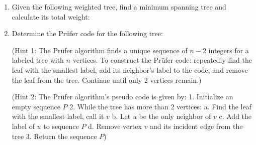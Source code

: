 \documentclass{article}
\theoremstyle{definition}
\begin{document}
\begin{enumerate}
\item Given the following weighted tree, find a minimum spanning tree and calculate its total weight:
\begin{center}
\end{center}

\item Determine the Prüfer code for the following tree:

(Hint 1: The Prüfer algorithm finds a unique sequence of $n-2$ integers for a labeled tree with $n$ vertices. To construct the Prüfer code: repeatedly find the leaf with the smallest label, add its neighbor's label to the code, and remove the leaf from the tree. Continue until only 2 vertices remain.)

(Hint 2: The Prüfer algorithm's pseudo code is given by:
1. Initialize an empty sequence $P$
2. While the tree has more than 2 vertices:
   a. Find the leaf with the smallest label, call it $v$
   b. Let $u$ be the only neighbor of $v$
   c. Add the label of $u$ to sequence $P$
   d. Remove vertex $v$ and its incident edge from the tree
3. Return the sequence $P$)

\begin{center}
\end{center}
\end{enumerate}
\end{document}
